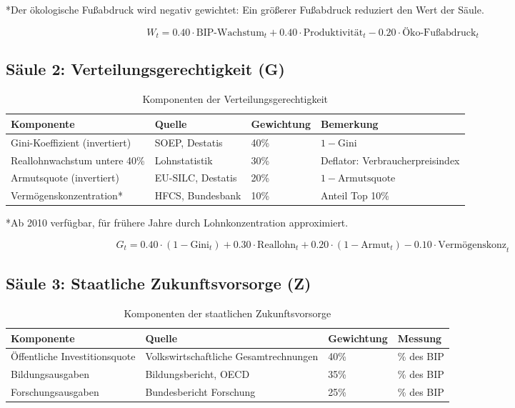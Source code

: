 *Der ökologische Fußabdruck wird negativ gewichtet: Ein größerer Fußabdruck reduziert den Wert der Säule.

\[
W_t = 0.40 \cdot \text{BIP-Wachstum}_t + 0.40 \cdot \text{Produktivität}_t - 0.20 \cdot \text{Öko-Fußabdruck}_t
\]

\subsection{Säule 2: Verteilungsgerechtigkeit (G)}

\begin{table}[h]
\centering
\begin{tabular}{llll}
\toprule
\textbf{Komponente} & \textbf{Quelle} & \textbf{Gewichtung} & \textbf{Bemerkung} \\
\midrule
Gini-Koeffizient (invertiert) & SOEP, Destatis & 40\% & $1 - \text{Gini}$ \\
Reallohnwachstum untere 40\% & Lohnstatistik & 30\% & Deflator: Verbraucherpreisindex \\
Armutsquote (invertiert) & EU-SILC, Destatis & 20\% & $1 - \text{Armutsquote}$ \\
Vermögenskonzentration* & HFCS, Bundesbank & 10\% & Anteil Top 10\% \\
\bottomrule
\end{tabular}
\caption{Komponenten der Verteilungsgerechtigkeit}
\label{tab:komponenten-gerechtigkeit}
\end{table}

*Ab 2010 verfügbar, für frühere Jahre durch Lohnkonzentration approximiert.

\[
G_t = 0.40 \cdot (1 - \text{Gini}_t) + 0.30 \cdot \text{Reallohn}_t + 0.20 \cdot (1 - \text{Armut}_t) - 0.10 \cdot \text{Vermögenskonz}_t
\]

\subsection{Säule 3: Staatliche Zukunftsvorsorge (Z)}

\begin{table}[h]
\centering
\begin{tabular}{llll}
\toprule
\textbf{Komponente} & \textbf{Quelle} & \textbf{Gewichtung} & \textbf{Messung} \\
\midrule
Öffentliche Investitionsquote & Volkswirtschaftliche Gesamtrechnungen & 40\% & \% des BIP \\
Bildungsausgaben & Bildungsbericht, OECD & 35\% & \% des BIP \\
Forschungsausgaben & Bundesbericht Forschung & 25\% & \% des BIP \\
\bottomrule
\end{tabular}
\caption{Komponenten der staatlichen Zukunftsvorsorge}
\label{tab:komponenten-zukunft}
\end{table}


